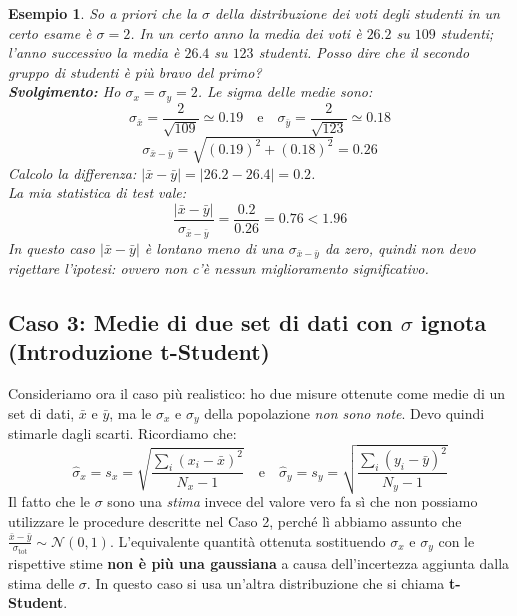 \documentclass[openany,a4paper,12pt]{book}
\newtheorem{esempio}{Esempio}
\theoremstyle{remark}
\begin{document}
\begin{esempio}
So a priori che la $\sigma$ della distribuzione dei voti degli studenti in un certo esame è $\sigma = 2$. In un certo anno la media dei voti è $26.2$ su $109$ studenti; l'anno successivo la media è $26.4$ su $123$ studenti. Posso dire che il secondo gruppo di studenti è più bravo del primo? \\
\textbf{Svolgimento:} Ho $\sigma_x = \sigma_y = 2$. Le sigma delle medie sono:
$$ \sigma_{\bar{x}} = \frac{2}{\sqrt{109}} \simeq 0.19 \quad \text{e} \quad \sigma_{\bar{y}} = \frac{2}{\sqrt{123}} \simeq 0.18 $$
$$ \sigma_{\bar{x}-\bar{y}} = \sqrt{(0.19)^2 + (0.18)^2} = 0.26 $$
Calcolo la differenza: $|\bar{x}-\bar{y}| = |26.2 - 26.4| = 0.2$. \\
La mia statistica di test vale:
$$ \frac{|\bar{x}-\bar{y}|}{\sigma_{\bar{x}-\bar{y}}} = \frac{0.2}{0.26} = 0.76 < 1.96 $$
In questo caso $|\bar{x}-\bar{y}|$ è lontano meno di una $\sigma_{\bar{x}-\bar{y}}$ da zero, quindi non devo rigettare l'ipotesi: ovvero non c'è nessun miglioramento significativo.
\end{esempio}

\subsection*{Caso 3: Medie di due set di dati con $\sigma$ ignota (Introduzione t-Student)}
Consideriamo ora il caso più realistico: ho due misure ottenute come medie di un set di dati, $\bar{x}$ e $\bar{y}$, ma le $\sigma_x$ e $\sigma_y$ della popolazione \textit{non sono note}. Devo quindi stimarle dagli scarti. Ricordiamo che:
$$ \hat{\sigma}_x = s_x = \sqrt{\frac{\sum_{i} (x_i - \bar{x})^2}{N_x - 1}} \quad \text{e} \quad \hat{\sigma}_y = s_y = \sqrt{\frac{\sum_{i} (y_i - \bar{y})^2}{N_y - 1}} $$
Il fatto che le $\sigma$ sono una \textit{stima} invece del valore vero fa sì che non possiamo utilizzare le procedure descritte nel Caso 2, perché lì abbiamo assunto che $\frac{\bar{x}-\bar{y}}{\sigma_{\text{tot}}} \sim \mathcal{N}(0,1)$.
L'equivalente quantità ottenuta sostituendo $\sigma_x$ e $\sigma_y$ con le rispettive stime \textbf{non è più una gaussiana} a causa dell'incertezza aggiunta dalla stima delle $\sigma$.
In questo caso si usa un'altra distribuzione che si chiama \textbf{t-Student}.
\end{document}
